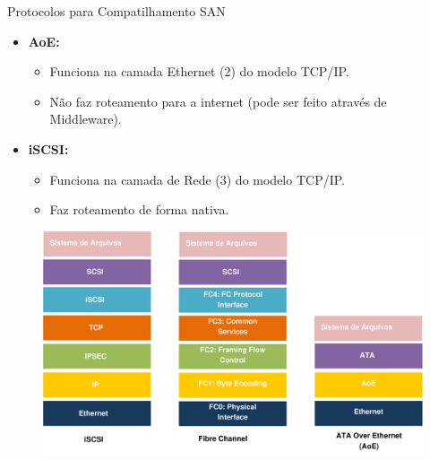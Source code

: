 \documentclass{beamer}
\begin{document}
\begin{frame}{Protocolos para Compatilhamento SAN}
\begin{itemize}
	\item \textbf{AoE:} 
	\begin{itemize}
		\item Funciona na camada Ethernet (2) do modelo TCP/IP.
		\item Não faz roteamento para a internet (pode ser feito através de Middleware).
	\end{itemize}
	\item \textbf{iSCSI: } 
	\begin{itemize}
		\item Funciona na camada de Rede (3) do modelo TCP/IP.
		\item Faz roteamento de forma nativa.
	\end{itemize}
\end{itemize}
\begin{figure}[hbtp]
	\centering
	\includegraphics[width=.7\linewidth]{./img/comparativo_camadas}
	\label{fig_comparativo_protocolos}
\end{figure}
\end{frame}
\end{document}
